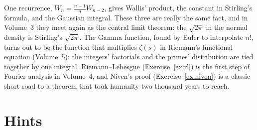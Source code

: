 \begin{beauty}
One recurrence, $W_n=\frac{n-1}nW_{n-2}$, gives Wallis' product, the constant in Stirling's formula, and the Gaussian integral. These three
are really the same fact, and in Volume~3 they meet again as the central limit theorem: the $\sqrt{2\pi}$ in the normal density is Stirling's
$\sqrt{2\pi}$. The Gamma function, found by Euler to interpolate $n!$, turns out to be the function that multiplies $\zeta(s)$ in Riemann's
functional equation (Volume~5): the integers' factorials and the primes' distribution are tied together by one integral. Riemann--Lebesgue
(Exercise~\ref{ex:rl}) is the first step of Fourier analysis in Volume~4, and Niven's proof (Exercise~\ref{ex:niven}) is a classic short road
to a theorem that took humanity two thousand years to reach.
\end{beauty}

\section{Hints}

